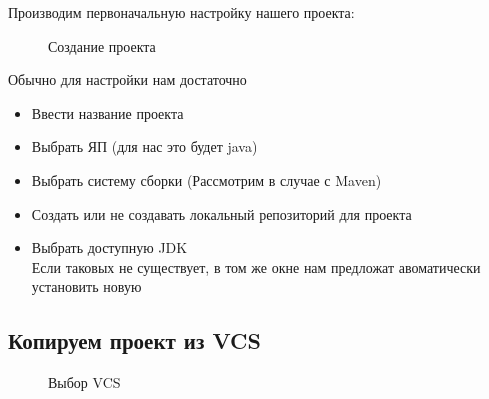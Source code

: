 \documentclass[12pt, a4paper]{article}
\begin{document}
    Производим первоначальную настройку нашего проекта:
    
    \begin{figure}[H]
        \caption{Создание проекта}
    \end{figure}

    Обычно для настройки нам достаточно
    \begin{itemize}
        \item Ввести название проекта
        \item Выбрать ЯП (для нас это будет java)
        \item Выбрать систему сборки (Рассмотрим в случае с Maven)
        \item Создать или не создавать локальный репозиторий для проекта
        \item Выбрать доступную JDK\\
        Если таковых не существует, в том же окне нам предложат авоматически установить новую
    \end{itemize}


    \newpage
    \subsection{Копируем проект из VCS}
    
    \begin{figure}[H]
        \caption{Выбор VCS}
    \end{figure}
\end{document}
